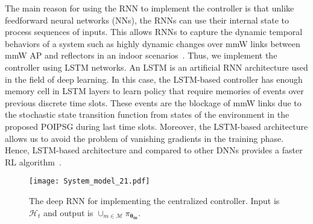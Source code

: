 \documentclass[conference]{IEEEtran}
\begin{document}
The main reason for using the RNN to implement the controller is that unlike feedforward neural networks (NNs), the RNNs can use their internal state to process sequences of inputs. This allows RNNs to capture the dynamic temporal behaviors of a system such as highly dynamic changes over mmW links between mmW AP and reflectors in an indoor scenarios~\cite{Sutton2018}. Thus, we implement the controller using LSTM networks. An LSTM is an artificial RNN architecture used in the field of deep learning. In this case, the LSTM-based controller has enough memory cell in LSTM layers to learn policy that require memories of events over previous discrete time slots. These events are the blockage of mmW links due to the stochastic state transition function from states of the environment in the proposed POIPSG during last time slots. Moreover, the LSTM-based architecture allows us to avoid the problem of vanishing gradients in the training phase. Hence, LSTM-based architecture and compared to other DNNs provides a faster RL algorithm~\cite{Sutton2018}.
\begin{figure}[!t]
	\begin{center}
		\texttt{[image: System\_model\_21.pdf]}		\vspace{-0.2cm}
		\caption{ \small The deep RNN for implementing the centralized controller. Input is $\mathcal{H}_{t}$ and output is $\cup_{m \in \mathcal{M}}\pi_{\boldsymbol{\theta_m}}$. \vspace{-1cm} }
		\label{System_model_21}
	\end{center}
\end{figure}
\end{document}
